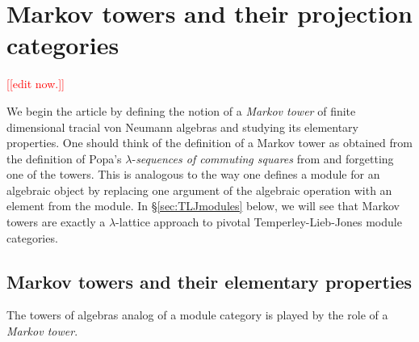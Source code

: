 \documentclass[11pt]{article}
\theoremstyle{plain}
\theoremstyle{definition}
\newcommand{\nn}[1]{\textcolor{red}{[[#1]]}}
\begin{document}
\section{Markov towers and their projection categories} 
\label{sec:MarkovTowers}

\nn{edit now.}

We begin the article by defining the notion of a \emph{Markov tower} of finite dimensional tracial von Neumann algebras and studying its elementary properties.
One should think of the definition of a Markov tower as obtained from the definition of Popa's $\lambda$-\emph{sequences of commuting squares} from \cite{MR1334479} and forgetting one of the towers.
This is analogous to the way one defines a module for an algebraic object by replacing one argument of the algebraic operation with an element from the module.
In \S\ref{sec:TLJmodules} below, we will see that Markov towers are exactly a $\lambda$-lattice approach to pivotal Temperley-Lieb-Jones module categories.

\subsection{Markov towers and their elementary properties}
\label{sec:MarkovTowersAndElementaryProperties}

The towers of algebras analog of a module category is played by the role of a \emph{Markov tower}.
\end{document}
